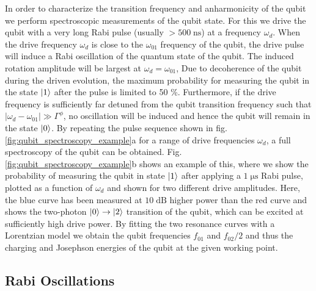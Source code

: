 In order to characterize the transition frequency and anharmonicity of the qubit we perform spectroscopic measurements of the qubit state. For this we drive the qubit with a very long Rabi pulse (usually $> 500\;\mathrm{ns}$) at a frequency $\omega_d$. When the drive frequency $\omega_{d}$ is close to the $\omega_{01}$ frequency of the qubit, the drive pulse will induce a Rabi oscillation of the quantum state of the qubit. The induced rotation amplitude will be largest at $\omega_d=\omega_{01}$, Due to decoherence of the qubit during the driven evolution, the maximum probability for measuring the qubit in the state $\left| 1 \right>$ after the pulse is limited to 50 \%. Furthermore, if the drive frequency is sufficiently far detuned from the qubit transition frequency such that $|\omega_d-\omega_{01}|\gg \Gamma^\phi$, no oscillation will be induced and hence the qubit will remain in the state $\left| 0 \right>$. By repeating the pulse sequence shown in fig. \ref{fig:qubit_spectroscopy_example}a for a range of drive frequencies $\omega_d$, a full spectroscopy of the qubit can be obtained. Fig. \ref{fig:qubit_spectroscopy_example}b shows an example of this, where we show the probability of measuring the qubit in state $\left| 1 \right>$ after applying a $1\;\mathrm{\mu s}$ Rabi pulse, plotted as a function of $\omega_d$ and shown for two different drive amplitudes. Here, the blue curve has been measured at $10\;\mathrm{dB}$ higher power than the red curve and shows the two-photon $\left| 0 \right>\to\left| 2 \right>$ transition of the qubit, which can be excited at sufficiently high drive power. By fitting the two resonance curves with a Lorentzian model we obtain the qubit frequencies $f_{01}$ and $f_{02}/2$ and thus the charging and Josephson energies of the qubit at the given working point.

\subsection{Rabi Oscillations} \label{section:qubit_rabi}

